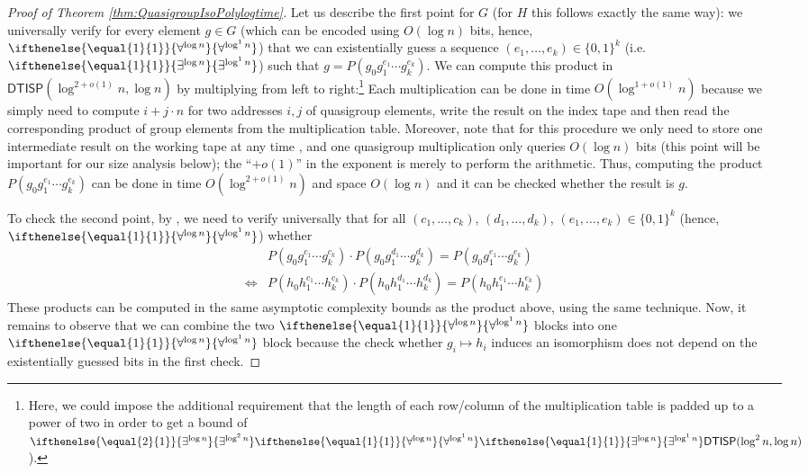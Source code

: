 \documentclass{article}
\newcommand{\betacc}[1]{\ifthenelse{\equal{#1}{1}}{\exists^{\log n}}{\exists^{\log^{#1}n}}} %
\newcommand{\alphacc}[1]{\ifthenelse{\equal{#1}{1}}{\forall^{\log n}}{\forall^{\log^{#1}n}}} %
\newcommand{\Oh}{O}
\newcommand*{\ComplexityClass}[1]{\ensuremath{\mathsf{#1}}\xspace}
\newcommand{\DTISP}{\ComplexityClass{DTISP}}
\begin{document}
\begin{proof}[Proof of Theorem \ref{thm:QuasigroupIsoPolylogtime}]
Let us describe the first point for $G$ (for $H$ this follows exactly the same way): we universally verify for every element $g \in G$ (which can be encoded using $\Oh(\log n)$ bits, hence, $\alphacc{1}$) that we can existentially guess a sequence $(e_1, \dots, e_k) \in \{0,1\}^k$ (i.e.\ $\betacc{1}$) such that $g = P(g_0g_1^{e_1} \cdots g_k^{e_k})$. 
We can compute this product in $\DTISP(\log^{2+o(1)} n, \log n)$ by multiplying from left to right:\footnote{Here, we could impose the additional requirement that the length of each row/column of the multiplication table is padded up to a power of two in order to get a bound of $\betacc{2}\alphacc{1}\betacc{1}\DTISP(\log^2n,\log n)$).\label{fn:16}} Each multiplication can be done in time $\Oh(\log^{1+o(1)} n)$ because we simply need to compute $i+j\cdot n$ for two addresses $i,j$ of quasigroup elements, write the result on the index tape and then read the corresponding product of group elements from the multiplication table. Moreover, note that for this procedure we only need to store one intermediate result on the working tape at any time
, and one quasigroup multiplication only queries $O(\log n)$ bits (this point will be important for our size analysis below); the ``$+o(1)$'' in the exponent is merely to perform the arithmetic. 
Thus, computing the product $P(g_0g_1^{e_1} \cdots g_k^{e_k})$ can be done in time $\Oh(\log^{2+o(1)} n)$ and space $\Oh(\log n)$ and it can be checked whether the result is $g$.

To check the second point, by \cite{ChattopadhyayToranWagner}, we need to verify universally that for all $(c_1, \dots, c_k)$, $(d_1, \dots, d_k)$, $(e_1, \dots, e_k) \in \{0,1\}^k$ (hence, $\alphacc{1}$) whether 
\begin{align*}
& P(g_0g_1^{c_1} \cdots g_k^{c_k})\cdot P(g_0g_1^{d_1} \cdots g_k^{d_k}) = P(g_0g_1^{e_1} \cdots g_k^{e_k}) \\
 \iff & P(h_0h_1^{c_1} \cdots h_k^{c_k})\cdot P(h_0h_1^{d_1} \cdots h_k^{d_k}) = P(h_0h_1^{e_1} \cdots h_k^{e_k})
\end{align*}
These products can be computed in the same asymptotic complexity bounds as the product above, using the same technique. Now, it remains to observe that we can combine the two $\alphacc{1}$ blocks into one  $\alphacc{1}$ block because the check whether $g_i \mapsto h_i$ induces an isomorphism does not depend on the existentially guessed bits in the first check.


\end{proof}
\end{document}
